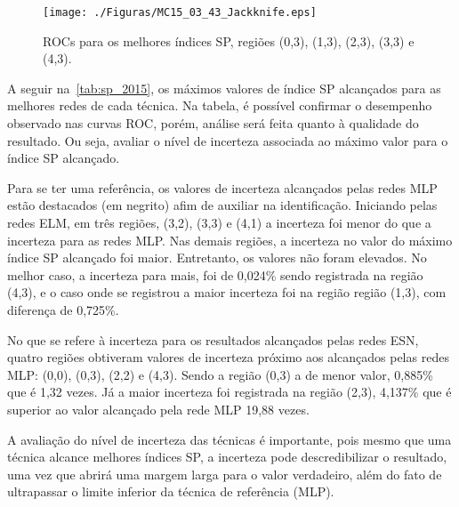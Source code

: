 \begin{figure}[H]
	\caption{ROCs para os melhores índices SP, regiões (0,3), (1,3), (2,3), (3,3) e (4,3).}
	\centerline{\texttt{[image: ./Figuras/MC15\_03\_43\_Jackknife.eps]}}
	\label{fig:MC15_ROCs_03_43}
\end{figure}


A seguir na~\autoref{tab:sp_2015}, os máximos valores de índice SP alcançados para as melhores redes de cada técnica. Na tabela, é possível confirmar o desempenho observado nas curvas ROC, porém, análise será feita quanto à qualidade do resultado. Ou seja, avaliar o nível de incerteza associada ao máximo valor para o índice SP alcançado.

Para se ter uma referência, os valores de incerteza alcançados pelas redes MLP estão destacados (em negrito) afim de auxiliar na identificação. Iniciando pelas redes ELM, em três regiões, (3,2), (3,3) e (4,1) a incerteza foi menor do que a incerteza para as redes MLP. Nas demais regiões, a incerteza no valor do máximo índice SP alcançado foi maior. Entretanto, os valores não foram elevados. No melhor caso, a incerteza para mais, foi de  0,024\% sendo registrada na região (4,3), e o caso onde se registrou a maior incerteza foi na região região (1,3), com diferença de 0,725\%.

No que se refere à incerteza para os resultados alcançados pelas redes ESN, quatro regiões obtiveram valores de incerteza próximo aos alcançados pelas redes MLP: (0,0), (0,3), (2,2) e (4,3). Sendo a região (0,3) a de menor valor, 0,885\% que é 1,32 vezes. Já a maior incerteza foi registrada na região (2,3), 4,137\% que é superior ao valor alcançado pela rede MLP 19,88 vezes.

A avaliação do nível de incerteza das técnicas é importante, pois mesmo que uma técnica alcance melhores índices SP, a incerteza pode descredibilizar o resultado, uma vez que abrirá uma margem larga para o valor verdadeiro, além do fato de ultrapassar o limite inferior da técnica de referência (MLP).


